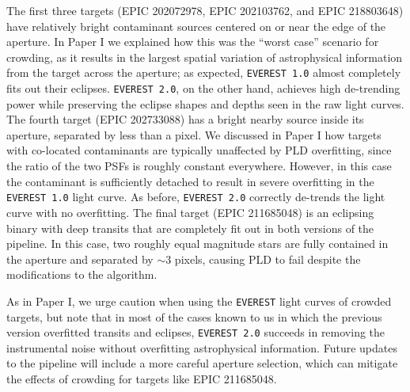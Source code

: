 \documentclass[]{emulateapj}
\begin{document}
The first three targets (EPIC 202072978, EPIC 202103762, and EPIC 218803648) have relatively bright
contaminant sources centered on or near the edge of the aperture. In Paper I we explained how this
was the ``worst case'' scenario for crowding, as it results in the largest spatial variation of 
astrophysical information from the target across the aperture; as expected, \texttt{EVEREST 1.0}
almost completely fits out their eclipses. \texttt{EVEREST 2.0}, on the other hand, achieves high
de-trending power while preserving the eclipse shapes and depths seen in the raw light curves.
The fourth target (EPIC 202733088) has a bright nearby source inside its aperture, separated by 
less than a pixel. We discussed in Paper I how targets with co-located contaminants are typically
unaffected by PLD overfitting, since the ratio of the two PSFs is roughly constant everywhere.
However, in this case the contaminant is sufficiently detached to result in severe overfitting
in the \texttt{EVEREST 1.0} light curve. As before, \texttt{EVEREST 2.0} correctly de-trends the light curve with
no overfitting. The final target (EPIC 211685048) is an eclipsing binary with deep transits that are completely
fit out in both versions of the pipeline. In this case, two roughly equal magnitude stars are
fully contained in the aperture and separated by ${\sim}3$ pixels, causing PLD to fail despite
the modifications to the algorithm.

As in Paper I, we urge caution when using the \texttt{EVEREST} light curves of crowded targets,
but note that in most of the cases known to us in which the previous version overfitted transits 
and eclipses, \texttt{EVEREST 2.0} succeeds in removing the instrumental noise without overfitting
astrophysical information. Future updates to the pipeline will include a more careful aperture
selection, which can mitigate the effects of crowding for targets like EPIC 211685048.
\end{document}
